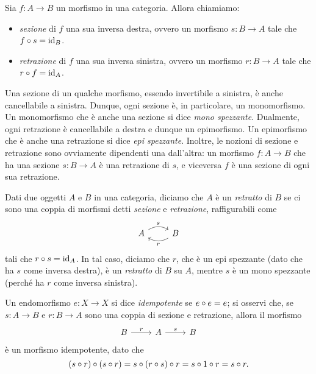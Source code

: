 \begin{definition}
	Sia \(f \colon A \to B\) un morfismo in una categoria.
	Allora chiamiamo:
	\begin{itemize}
		\item \emph{sezione} di \(f\) una sua inversa destra, ovvero un morfismo \(s \colon B \to A\) tale che \(f \circ s = \mathrm{id}_{B}\).
		\item \emph{retrazione} di \(f\) una sua inversa sinistra, ovvero un morfismo \(r \colon B \to A\) tale che \(r \circ f = \mathrm{id}_{A}\).
	\end{itemize}
\end{definition}
\begin{definition}
	Una sezione di un qualche morfismo, essendo invertibile a sinistra, è anche cancellabile a sinistra.
	Dunque, ogni sezione è, in particolare, un monomorfismo.
	Un monomorfismo che è anche una sezione si dice \emph{mono spezzante}.
	Dualmente, ogni retrazione è cancellabile a destra e dunque un epimorfismo.
	Un epimorfismo che è anche una retrazione si dice \emph{epi spezzante}.
	Inoltre, le nozioni di sezione e retrazione sono ovviamente dipendenti una dall'altra:
	un morfismo \(f : A \to B\) che ha una sezione \(s : B\to A\) è una retrazione di \(s\),
	e viceversa \(f\) è una sezione di ogni sua retrazione.
\end{definition}
\begin{definition}[Retratto]
	Dati due oggetti \(A\) e \(B\) in una categoria,
	diciamo che \(A\) è un \emph{retratto} di \(B\) se ci sono una coppia di morfismi detti \emph{sezione} e \emph{retrazione}, raffigurabili come
	\begin{equation}
		\begin{tikzcd}
			A \ar[r, bend left, "s"] &B \ar[l, bend left, "r"]
		\end{tikzcd}
	\end{equation}
	tali che \(r \circ s = \mathrm{id}_A\).
	In tal caso, diciamo che \(r\), che è un epi spezzante (dato che ha \(s\) come inversa destra), è un \emph{retratto} di \(B\) su \(A\), mentre \(s\) è un mono spezzante (perché ha \(r\) come inversa sinistra).
\end{definition}
\begin{remark}
	Un endomorfismo \(e : X\to X\) si dice \emph{idempotente} se \(e\circ e=e\); si osservi che, se \(s \colon A \to B\) e \(r \colon B \to A\) sono una coppia di sezione e retrazione,
	allora il morfismo
	\begin{equation}
		\begin{tikzcd}
			B \ar[r, "r"] & A \ar[r, "s"] &B
		\end{tikzcd}
	\end{equation}
	è un morfismo idempotente, dato che
	\[(s\circ r)\circ (s\circ r) = s\circ (r\circ s)\circ r = s\circ 1\circ r=s\circ r.\]
\end{remark}

